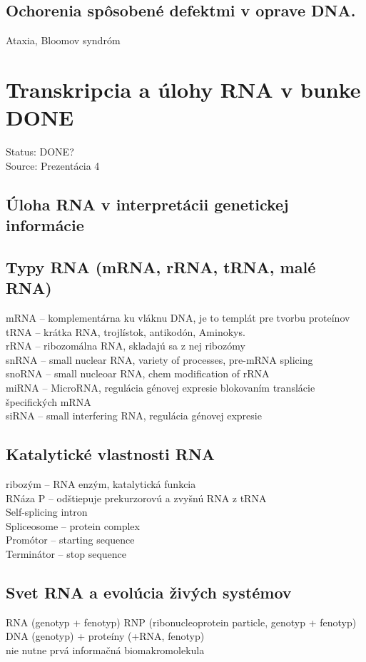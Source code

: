 \subsection{Ochorenia spôsobené defektmi v oprave DNA. }
Ataxia, Bloomov syndróm

\section{Transkripcia a úlohy RNA v bunke DONE}

Status: DONE?\\
Source: Prezentácia 4\\

\subsection{Úloha RNA v interpretácii genetickej informácie}

\subsection{Typy RNA (mRNA, rRNA, tRNA, malé RNA)}
mRNA -- komplementárna ku vláknu DNA, je to templát pre tvorbu proteínov\\
tRNA -- krátka RNA, trojlístok, antikodón, Aminokys. \\
rRNA -- ribozomálna RNA, skladajú sa z nej ribozómy\\
snRNA -- small nuclear RNA, variety of processes, pre-mRNA splicing\\
snoRNA -- small nucleoar RNA, chem modification of rRNA\\
miRNA -- MicroRNA, regulácia génovej expresie blokovaním translácie špecifických mRNA\\
siRNA -- small interfering RNA, regulácia génovej expresie\\
\subsection{Katalytické vlastnosti RNA}
ribozým -- RNA enzým, katalytická funkcia\\
RNáza P -- odštiepuje prekurzorovú a zvyšnú RNA z tRNA\\
Self-splicing intron\\
Spliceosome -- protein complex\\
Promótor -- starting sequence\\
Terminátor -- stop sequence\\
\subsection{Svet RNA a evolúcia živých systémov}
RNA (genotyp + fenotyp) \ra RNP (ribonucleoprotein particle, genotyp + fenotyp) \ra DNA (genotyp) + proteíny (+RNA, fenotyp)\\
nie nutne prvá informačná biomakromolekula\\
